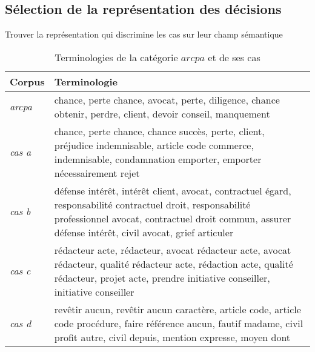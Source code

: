 \subsection{Sélection de la représentation des décisions}
\begin{frame}[t]{\mysubsectiontitle}
	Trouver la représentation qui discrimine les cas sur leur champ sémantique
	
	\begin{table}[ht]
		\scriptsize
		\begin{center}
			\begin{tabular}{|l|p{}|}
				\hline
				\textbf{Corpus} & \textbf{Terminologie} \\ \hline
				\textit{arcpa} & chance, perte chance, avocat, perte, diligence, chance obtenir, perdre, client, devoir conseil, manquement
				\\ \hline
				\textit{cas a} & chance, perte chance, chance succès, perte, client, préjudice indemnisable, article code commerce, indemnisable, condamnation emporter, emporter nécessairement rejet
				\\ \hline
				\textit{cas b} & défense intérêt, intérêt client, avocat, contractuel égard, responsabilité contractuel droit, responsabilité professionnel avocat, contractuel droit commun, assurer défense intérêt, civil avocat, grief articuler
				\\ \hline
				\textit{cas c} & rédacteur acte, rédacteur, avocat rédacteur acte, avocat rédacteur, qualité rédacteur acte, rédaction acte, qualité rédacteur, projet acte, prendre initiative conseiller, initiative conseiller
				\\ \hline
				\textit{cas d} & revêtir aucun, revêtir aucun caractère, article code, article code procédure, faire référence aucun, fautif madame, civil profit autre, civil depuis, mention expresse, moyen dont
				\\ \hline
			\end{tabular}
		\end{center}
		\caption{Terminologies de  la catégorie  $arcpa$ et de ses cas}
	\end{table}
\end{frame}
